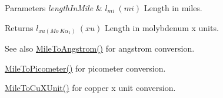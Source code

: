 \begin{DoxyParams}{Parameters}
{\em length\+In\+Mile} & $ l_{mi}\ (mi)$ Length in miles. \\
\hline
\end{DoxyParams}
\begin{DoxyReturn}{Returns}
$ l_{xu(Mo\ K\alpha_1)}\ (xu)$ Length in molybdenum x units. 
\end{DoxyReturn}
\begin{DoxySeeAlso}{See also}
\mbox{\hyperlink{group___e_g_x_math-_conversions-_length_conversions-_imperial-_mile-_non-_s_i_ga291d6035f59be619459011941676f7c7}{Mile\+To\+Angstrom()}} for angstrom conversion. 

\mbox{\hyperlink{group___e_g_x_math-_conversions-_length_conversions-_imperial-_mile-_s_i_ga470a1271de988c28cb4851e5930d99da}{Mile\+To\+Picometer()}} for picometer conversion. 

\mbox{\hyperlink{group___e_g_x_math-_conversions-_length_conversions-_imperial-_mile-_non-_s_i_ga63bec635d857da530046d1c5a165b1d8}{Mile\+To\+Cu\+X\+Unit()}} for copper x unit conversion. 
\end{DoxySeeAlso}
